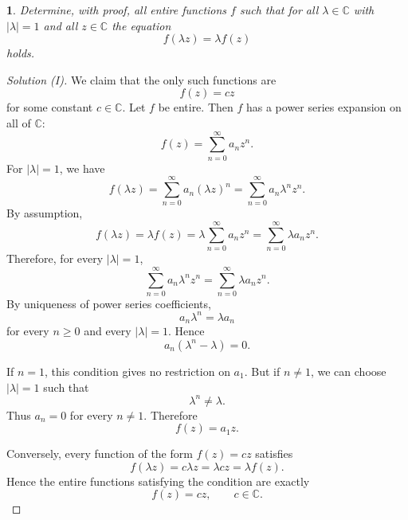 \documentclass[12pt, a4paper]{report}
\theoremstyle{spaced}
\newtheorem{exercise}{}
\begin{document}
\begin{exercise}
	Determine, with proof, all entire functions $f$ such that for all $\lambda\in\mathbb{C}$ with $|\lambda|=1$ and all $z\in\mathbb{C}$ the equation
	\[
		f(\lambda z)=\lambda f(z)
	\]
	holds.
\end{exercise}
\begin{proof}[Solution (I)]
	We claim that the only such functions are
	\[
		f(z)=cz
	\]
	for some constant \(c\in\mathbb C\).
	Let \(f\) be entire. Then \(f\) has a power series expansion on all of
	\(\mathbb C\):
	\[
		f(z)=\sum_{n=0}^{\infty} a_n z^n .
	\]
	For \(|\lambda|=1\), we have
	\[
		f(\lambda z)=\sum_{n=0}^{\infty} a_n(\lambda z)^n
		=\sum_{n=0}^{\infty} a_n \lambda^n z^n.
	\]
	By assumption,
	\[
		f(\lambda z)=\lambda f(z)
		=\lambda \sum_{n=0}^{\infty} a_n z^n
		=\sum_{n=0}^{\infty} \lambda a_n z^n.
	\]
	Therefore, for every \(|\lambda|=1\),
	\[
		\sum_{n=0}^{\infty} a_n\lambda^n z^n
		=
		\sum_{n=0}^{\infty} \lambda a_n z^n.
	\]
	By uniqueness of power series coefficients,
	\[
		a_n\lambda^n=\lambda a_n
	\]
	for every \(n\ge 0\) and every \(|\lambda|=1\). Hence
	\[
		a_n(\lambda^n-\lambda)=0.
	\]

	If \(n=1\), this condition gives no restriction on \(a_1\). But if
	\(n\neq 1\), we can choose \(|\lambda|=1\) such that
	\[
		\lambda^n\neq \lambda.
	\]
	Thus \(a_n=0\) for every \(n\neq 1\). Therefore
	\[
		f(z)=a_1z.
	\]

	Conversely, every function of the form \(f(z)=cz\) satisfies
	\[
		f(\lambda z)=c\lambda z=\lambda cz=\lambda f(z).
	\]
	Hence the entire functions satisfying the condition are exactly
	\[
		f(z)=cz,\qquad c\in\mathbb C.
	\]
\end{proof}
\end{document}
